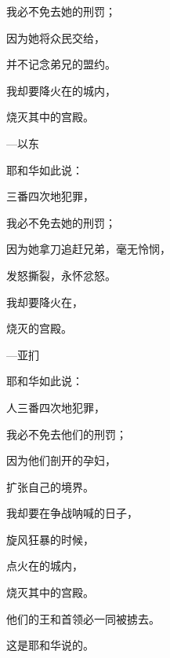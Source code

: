 {\par }{\Q 我必不免去她的刑罚；
\par }{\Q 因为她将众民交给{}，
\par }{\Q 并不记念弟兄的盟约。
\par }{\Q {}我却要降火在{}的城内，
\par }{\Q 烧灭其中的宫殿。
\par }{\SHB —以东
\par }{\Q {}耶和华如此说：
\par }{三番四次地犯罪，
\par }{\Q 我必不免去她的刑罚；
\par }{\Q 因为她拿刀追赶兄弟，毫无怜悯，
\par }{\Q 发怒撕裂，永怀忿怒。
\par }{\Q {}我却要降火在{}，
\par }{\Q 烧灭{}的宫殿。
\par }{\SHB —亚扪
\par }{\Q {}耶和华如此说：
\par }{人三番四次地犯罪，
\par }{\Q 我必不免去他们的刑罚；
\par }{\Q 因为他们剖开{}的孕妇，
\par }{\Q 扩张自己的境界。
\par }{\Q {}我却要在争战呐喊的日子，
\par }{\Q 旋风狂暴的时候，
\par }{\Q 点火在{}的城内，
\par }{\Q 烧灭其中的宫殿。
\par }{\Q {}他们的王和首领必一同被掳去。
\par }{\Q 这是耶和华说的。

}

